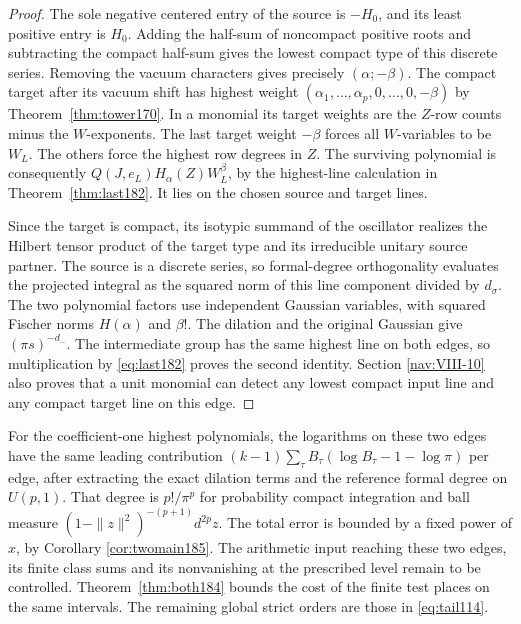 \documentclass[a4paper,11pt]{article}
\theoremstyle{definition}
\theoremstyle{remark}
\numberwithin{equation}{section}
\begin{document}
\begin{proof}
The sole negative centered entry of the source is
\(-H_0\), and its least positive entry is \(H_0\).
Adding the half-sum of noncompact positive roots and
subtracting the compact half-sum gives the lowest compact
type of this discrete series. Removing the vacuum
characters gives precisely \((\alpha;-\beta)\). The
compact target after its vacuum shift has highest weight
\((\alpha_1,\ldots,\alpha_p,0,\ldots,0,-\beta)\) by
Theorem~\ref{thm:tower170}. In a monomial its target
weights are the \(Z\)-row counts minus the \(W\)-exponents.
The last target weight \(-\beta\) forces all \(W\)-variables
to be \(W_L\). The others force the highest row degrees
in \(Z\). The surviving polynomial is consequently
\(Q(J,e_L)H_\alpha(Z) W_L^\beta\), by the highest-line
calculation in Theorem~\ref{thm:last182}. It lies on the
chosen source and target lines.

Since the target is compact, its isotypic summand of the
oscillator realizes the Hilbert tensor product of the
target type and its irreducible unitary source partner.
The source is a discrete series, so formal-degree
orthogonality evaluates the projected integral as the
squared norm of this line component divided by \(d_\sigma\).
The two polynomial factors use independent Gaussian
variables, with squared Fischer norms \(H(\alpha)\)
and \(\beta!\). The dilation and the original Gaussian
give \((\pi s)^{-d_-}\). The intermediate group has
the same highest line on both edges, so multiplication
by \eqref{eq:last182} proves the second identity.
Section \ref{nav:VIII-10}
also proves that a unit monomial can detect any lowest
compact input line and any compact target line on this edge.
\end{proof}

For the coefficient-one highest polynomials, the logarithms
on these two edges have the same leading contribution
\((k-1)\sum_\tau B_\tau(\log B_\tau-1-\log\pi)\) per edge,
after extracting the exact dilation terms and the reference
formal degree on \(U(p,1)\). That degree is \(p!/\pi^p\)
for probability compact integration and ball measure
\((1-\|z\|^2)^{-(p+1)}d^{2p}z\). The total error is bounded by
a fixed power of \(x\), by Corollary \ref{cor:twomain185}.
The arithmetic input reaching these two edges, its finite
class sums and its nonvanishing at the prescribed level
remain to be controlled. Theorem~\ref{thm:both184} bounds
the cost of the finite test places on the same intervals.
The remaining global strict orders are those in
\eqref{eq:tail114}.
\end{document}
